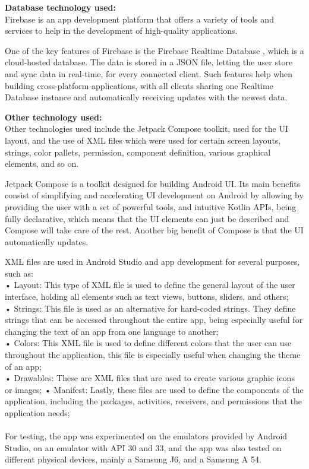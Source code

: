 \newpage

\textbf{Database technology used: } \\

Firebase \cite{2} is an app development platform that offers a variety of tools and services to help in the development of high-quality applications. 

One of the key features of Firebase is the Firebase Realtime Database \cite{3}, which is a cloud-hosted database. The data is stored in a \ac{JSON} file, letting the user store and sync data in real-time, for every connected client. Such features help when building cross-platform applications, with all clients sharing one Realtime Database instance and automatically receiving updates with the newest data.

\textbf{Other technology used: } \\

Other technologies used include the Jetpack Compose toolkit, used for the UI layout, and the use of XML files which were used for certain screen layouts, strings, color pallets, permission, component definition, various graphical elements, and so on.

Jetpack Compose \cite{4} is a toolkit designed for building Android \ac{UI}. Its main benefits consist of simplifying and accelerating \ac{UI} development on Android by allowing by providing the user with a set of powerful tools, and intuitive Kotlin \ac{API}s, being fully declarative, which means that the \ac{UI} elements can just be described and Compose will take care of the rest. Another big benefit of Compose is that the \ac{UI} automatically updates.

XML files are used in Android Studio and app development for several purposes, such as:\\
    • Layout: This type of XML file is used to define the general layout of the user interface, holding all elements such as text views, buttons, sliders, and others;\\
    • Strings: This file is used as an alternative for hard-coded strings. They define strings that can be accessed throughout the entire app, being especially useful for changing the text of an app from one language to another;\\
    • Colors: This XML file is used to define different colors that the user can use throughout the application, this file is especially useful when changing the theme of an app;\\
    • Drawables: These are XML files that are used to create various graphic icons or images;
    • Manifest: Lastly, these files are used to define the components of the application, including the packages, activities, receivers, and permissions that the application needs;\\
\\
For testing, the app was experimented on the emulators provided by Android Studio, on an emulator with \ac{API} 30 and 33, and the app was also tested on different physical devices, mainly a Samsung J6, and a Samsung A 54.

